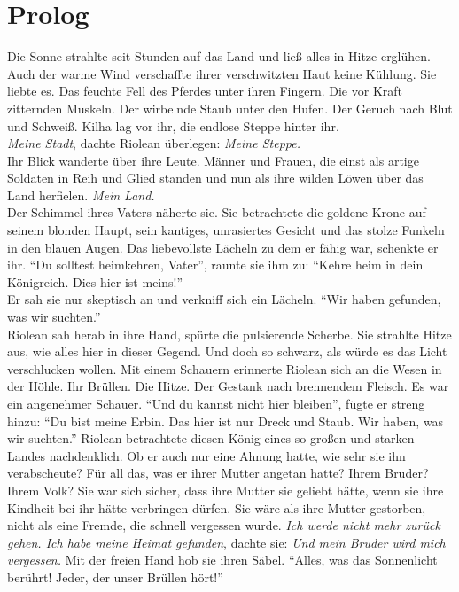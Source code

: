 \chapter{Prolog}

Die Sonne strahlte seit Stunden auf das Land und ließ alles in Hitze erglühen. Auch der warme Wind 
verschaffte ihrer verschwitzten Haut keine Kühlung. Sie liebte es. Das feuchte Fell des Pferdes 
unter ihren Fingern. Die vor Kraft zitternden Muskeln. Der wirbelnde Staub unter den Hufen. Der 
Geruch nach Blut und Schweiß. Kilha lag vor ihr, die endlose Steppe hinter ihr.\\
\textit{Meine Stadt}, dachte Riolean überlegen: \textit{Meine Steppe.}\\
Ihr Blick wanderte über ihre Leute. Männer und Frauen, die einst als artige Soldaten in Reih und 
Glied standen und nun als ihre wilden Löwen über das Land herfielen. \textit{Mein Land.}\\
Der Schimmel ihres Vaters näherte sie. Sie betrachtete die goldene Krone auf seinem blonden Haupt, 
sein kantiges, unrasiertes Gesicht und das stolze Funkeln in den blauen Augen. Das liebevollste 
Lächeln zu dem er fähig war, schenkte er ihr. ``Du solltest heimkehren, Vater'', raunte sie ihm zu: 
``Kehre heim in dein Königreich. Dies hier ist meins!''\\
Er sah sie nur skeptisch an und verkniff sich ein Lächeln. ``Wir haben gefunden, was wir 
suchten.''\\
Riolean sah herab in ihre Hand, spürte die pulsierende Scherbe. Sie strahlte Hitze aus, wie alles 
hier in dieser Gegend. Und doch so schwarz, als würde es das Licht verschlucken wollen. Mit einem 
Schauern erinnerte Riolean sich an die Wesen in der Höhle. Ihr Brüllen. Die Hitze. Der Gestank nach 
brennendem Fleisch. Es war ein angenehmer Schauer. ``Und du kannst nicht hier bleiben'', fügte er 
streng hinzu: ``Du bist meine Erbin. Das hier ist nur Dreck und Staub. Wir haben, was wir suchten.''
Riolean betrachtete diesen König eines so großen und starken Landes nachdenklich. Ob er auch nur 
eine Ahnung hatte, wie sehr sie ihn verabscheute? Für all das, was er ihrer Mutter angetan 
hatte? Ihrem Bruder? Ihrem Volk? Sie war sich sicher, dass ihre Mutter sie geliebt hätte, wenn 
sie ihre Kindheit bei ihr hätte verbringen dürfen. Sie wäre als ihre Mutter gestorben, nicht als 
eine Fremde, die schnell vergessen wurde. \textit{Ich werde nicht mehr zurück gehen. Ich habe 
meine Heimat gefunden}, dachte sie: \textit{Und mein Bruder wird mich vergessen.} Mit der freien 
Hand hob sie ihren Säbel. ``Alles, was das Sonnenlicht berührt! Jeder, der unser Brüllen hört!''\\
